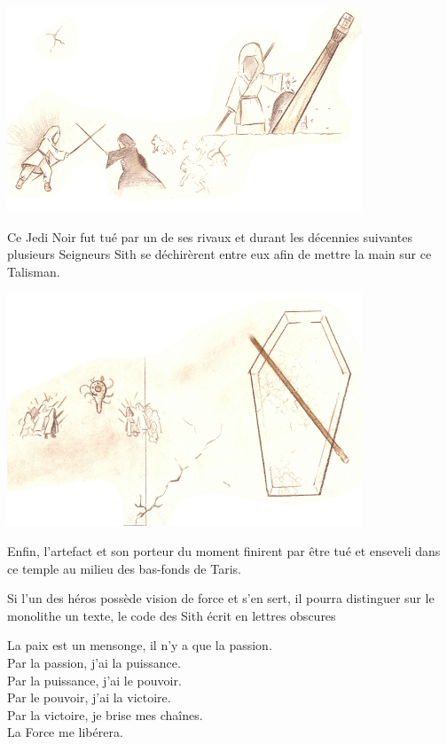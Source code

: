 \begin{quotebox}
\noindent\includegraphics[width=\linewidth]{_img/places/monolithe-003.png}

Ce Jedi Noir fut tué par un de ses rivaux et durant les décennies suivantes plusieurs Seigneurs Sith se déchirèrent entre eux afin de mettre la main sur ce Talisman. 

\noindent\includegraphics[width=\linewidth]{_img/places/monolithe-004.png}

Enfin, l’artefact et son porteur du moment finirent par être tué et enseveli dans ce temple au milieu des bas-fonds de Taris.
\end{quotebox}

Si l’un des héros possède vision de force et s’en sert, il pourra distinguer sur le monolithe un texte, le code des Sith écrit en lettres obscures
\begin{quotebox}
La paix est un mensonge, il n’y a que la passion. \\
Par la passion, j’ai la puissance. \\
Par la puissance, j’ai le pouvoir. \\
Par le pouvoir, j’ai la victoire. \\
Par la victoire, je brise mes chaînes. \\
La Force me libérera.
\end{quotebox}


